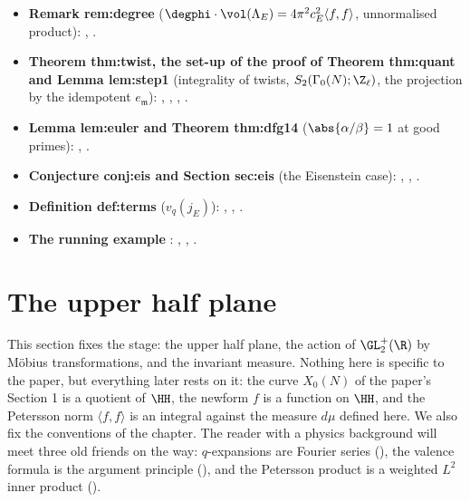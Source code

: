 \begin{itemize}
\item \textbf{Remark rem:degree} ($\degphi\cdot\vol(\Lambda_E)=4\pi^2c_E^2\langle f,f\rangle$, unnormalised product): , .
\item \textbf{Theorem thm:twist, the set-up of the proof of Theorem thm:quant and Lemma lem:step1} (integrality of twists, $S_2(\Gamma_0(N);\Z_\ell)$, the projection by the idempotent $e_{\mathfrak m}$): ,
, , .
\item \textbf{Lemma lem:euler and Theorem thm:dfg14} ($\abs{\alpha/\beta}=1$ at good primes): , .
\item \textbf{Conjecture conj:eis and Section sec:eis} (the Eisenstein case): , , .
\item \textbf{Definition def:terms} ($v_q(j_E)$): , , .
\item \textbf{The running example }: , , .
\end{itemize}

\section{The upper half plane}\label{sec:modforms:upper-half-plane}

This section fixes the stage: the upper half plane, the action of $\GL_2^+(\R)$ by M\"obius transformations, and the invariant
measure. Nothing here is specific to the paper, but everything later rests on it: the curve $X_0(N)$ of the paper's Section 1 is a
quotient of $\HH$, the newform $f$ is a function on $\HH$, and the Petersson norm $\langle f,f\rangle$ is an integral against the measure
$d\mu$ defined here. We also fix the conventions of the chapter. The reader with a physics background will meet three old friends
on the way: $q$-expansions are Fourier series (), the valence formula is the argument principle
(), and the Petersson product is a weighted $L^2$ inner product ().


